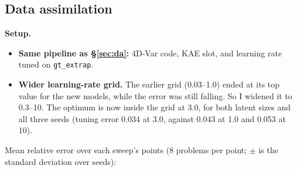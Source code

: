 \subsection{Data assimilation}

\textbf{Setup.}
\begin{itemize}
\item \textbf{Same pipeline as \S\ref{sec:da}:} 4D-Var code, KAE slot, and learning rate tuned
  on \texttt{gt\_extrap}.
\item \textbf{Wider learning-rate grid.} The earlier grid (0.03--1.0) ended at its top value
  for the new models, while the error was still falling. So I widened it to 0.3--10. The
  optimum is now inside the grid at 3.0, for both latent sizes and all three seeds (tuning
  error 0.034 at 3.0, against 0.043 at 1.0 and 0.053 at 10).
\end{itemize}

Mean relative error over each sweep's points (8 problems per point; $\pm$ is the standard
deviation over seeds):

